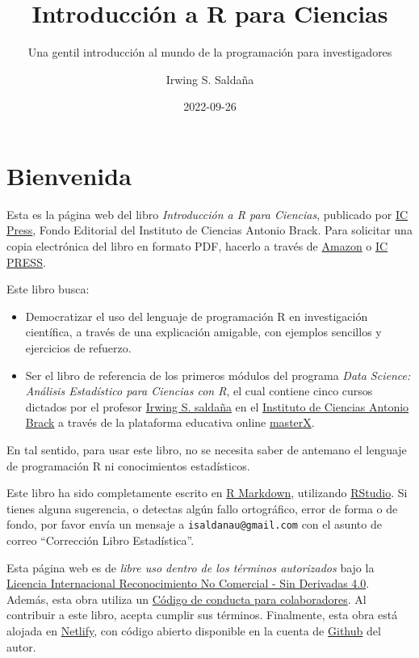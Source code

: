 \documentclass[
]{article}
\title{Introducción a R para Ciencias}
\subtitle{Una gentil introducción al mundo de la programación para investigadores}
\author{Irwing S. Saldaña}
\date{2022-09-26}
\theoremstyle{definition}
\theoremstyle{definition}
\theoremstyle{definition}
\theoremstyle{definition}
\theoremstyle{remark}
\begin{document}
\maketitle

{
\hypersetup{linkcolor=}
\setcounter{tocdepth}{2}
\tableofcontents
}
\hypertarget{bienvenida}{%
\section*{\texorpdfstring{\textbf{Bienvenida}}{Bienvenida}}\label{bienvenida}}

Esta es la página web del libro \emph{Introducción a R para Ciencias}, publicado por \href{https://www.brackinstitute.com/editorial}{IC Press}, Fondo Editorial del Instituto de Ciencias Antonio Brack. Para solicitar una copia electrónica del libro en formato PDF, hacerlo a través de \href{https://www.amazon.com/}{Amazon} o \href{https://www.brackinstitute.com/editorial}{IC PRESS}.

Este libro busca:

\begin{itemize}
\item
  Democratizar el uso del lenguaje de programación R en investigación científica, a través de una explicación amigable, con ejemplos sencillos y ejercicios de refuerzo.
\item
  Ser el libro de referencia de los primeros módulos del programa \emph{Data Science: Análisis Estadístico para Ciencias con R}, el cual contiene cinco cursos dictados por el profesor \href{https://scholar.google.com/citations?user=ZvRX_U0AAAAJ}{Irwing S. saldaña} en el \href{https://www.brackinstitute.com/}{Instituto de Ciencias Antonio Brack} a través de la plataforma educativa online \href{https://www.masterx.org/}{masterX}.
\end{itemize}

En tal sentido, para usar este libro, no se necesita saber de antemano el lenguaje de programación R ni conocimientos estadísticos.

Este libro ha sido completamente escrito en \href{https://bookdown.org/yihui/rmarkdown/}{R Markdown}, utilizando \href{https://www.rstudio.com/}{RStudio}. Si tienes alguna sugerencia, o detectas algún fallo ortográfico, error de forma o de fondo, por favor envía un mensaje a \texttt{isaldanau@gmail.com} con el asunto de correo ``Corrección Libro Estadística''.

Esta página web es de \emph{libre uso dentro de los términos autorizados} bajo la \href{https://creativecommons.org/licenses/by-nc-nd/4.0/legalcode}{Licencia Internacional Reconocimiento No Comercial - Sin Derivadas 4.0}. Además, esta obra utiliza un \href{https://www.contributor-covenant.org/version/2/0/code_of_conduct/}{Código de conducta para colaboradores}. Al contribuir a este libro, acepta cumplir sus términos. Finalmente, esta obra está alojada en \href{https://www.netlify.com}{Netlify}, con código abierto disponible en la cuenta de \href{https://github.com/irwingss/}{Github} del autor.
\end{document}
